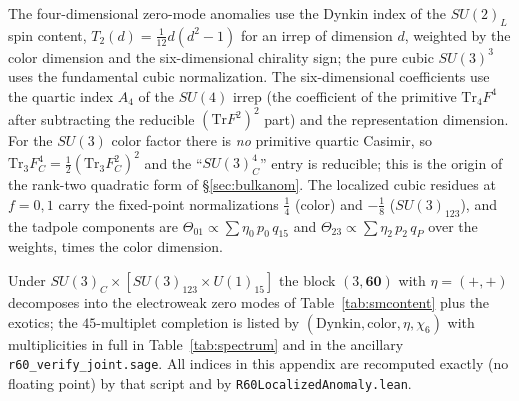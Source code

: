 \documentclass[11pt,a4paper]{article}
\newcommand{\Tr}{\mathrm{Tr}}
\begin{document}
The four-dimensional zero-mode anomalies use the Dynkin index of the $SU(2)_L$ spin
content, $T_2(d)=\tfrac1{12}d(d^2-1)$ for an irrep of dimension $d$, weighted by the
color dimension and the six-dimensional chirality sign; the pure cubic $SU(3)^3$ uses
the fundamental cubic normalization. The six-dimensional coefficients use the quartic
index $A_4$ of the $SU(4)$ irrep (the coefficient of the primitive $\Tr_4 F^4$ after
subtracting the reducible $(\Tr F^2)^2$ part) and the representation dimension. For the
$SU(3)$ color factor there is \emph{no} primitive quartic Casimir, so
$\Tr_3 F_C^4=\tfrac12(\Tr_3 F_C^2)^2$ and the ``$SU(3)_C^4$'' entry is reducible; this is
the origin of the rank-two quadratic form of \S\ref{sec:bulkanom}. The localized cubic
residues at $f=0,1$ carry the fixed-point normalizations $\tfrac14$ (color) and
$-\tfrac18$ ($SU(3)_{123}$), and the tadpole components are
$\Theta_{01}\propto\sum \eta_0\,p_0\,q_{15}$ and $\Theta_{23}\propto\sum \eta_2\,p_2\,q_P$
over the weights, times the color dimension.

Under $SU(3)_C\times[SU(3)_{123}\times U(1)_{15}]$ the block $(3,\mathbf{60})$ with
$\eta=(+,+)$ decomposes into the electroweak zero modes of Table~\ref{tab:smcontent}
plus the exotics; the $45$-multiplet completion is listed by
$(\text{Dynkin},\text{color},\eta,\chi_6)$ with multiplicities in full in
Table~\ref{tab:spectrum} and in the ancillary \texttt{r60\_verify\_joint.sage}. All indices in this
appendix are recomputed exactly (no floating point) by that script and by
\texttt{R60LocalizedAnomaly.lean}.
\end{document}
